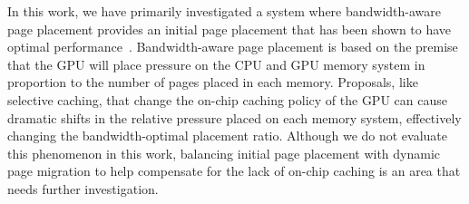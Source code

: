 In this work, we have primarily investigated a system where bandwidth-aware page placement
provides an initial page placement that has been shown to have optimal
performance~\cite{ref:agarwal:asplos2015}.
Bandwidth-aware page placement is based on the premise that the GPU will place pressure on
the CPU and GPU memory system in proportion to the number of pages placed in each memory.  Proposals,
like selective caching, that change the on-chip caching policy of the GPU can cause dramatic
shifts in the relative pressure placed on each memory system, effectively changing the bandwidth-optimal 
placement ratio.  Although we do not evaluate this phenomenon in this work, balancing
initial page placement with dynamic page migration to help compensate for the lack of on-chip
caching is an area that needs further investigation.
%
%
%
%
